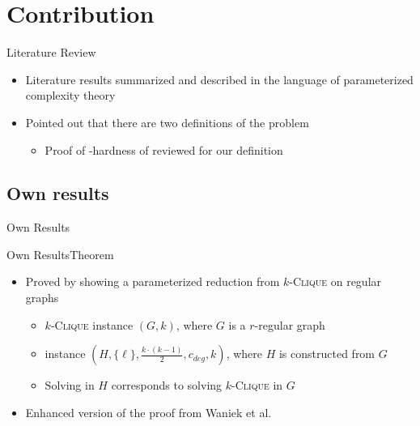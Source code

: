 \section{Contribution}

\begin{frame}{Literature Review}
    \begin{itemize}
        \item Literature results summarized and described in the language of parameterized complexity theory
        \item Pointed out that there are two definitions of the problem
        \begin{itemize}
            \item Proof of \NP-hardness of \HLdeg reviewed for our definition 
        \end{itemize}
    \end{itemize}
\end{frame}

\subsection
{Own results}

\begin{frame}{Own Results}
    
\end{frame}

\begin{frame}{Own Results}{Theorem}
    \begin{center}
    \end{center}
    \begin{center}
    \end{center}

    \begin{itemize}
        \item Proved by showing a parameterized reduction from $k$-\textsc{Clique} on regular graphs
        \begin{itemize}
            \item $k$-\textsc{Clique} instance $(G, k)$, where $G$ is a $r$-regular graph
            \item \HL instance $(H, \{\ell\}, \frac{k\cdot(k-1)}{2}, c_{deg}, k)$, where $H$ is constructed from $G$
            \item Solving \HL in $H$ corresponds to solving $k$-\textsc{Clique} in $G$
        \end{itemize}
        \item Enhanced version of the proof from Waniek et al.
    \end{itemize}
\end{frame}

